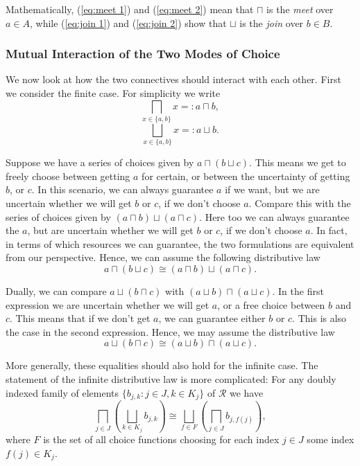 \documentclass[12pt]{article}
\theoremstyle{definition}
\theoremstyle{plain}
\theoremstyle{plain}
\theoremstyle{plain}
\theoremstyle{plain}
\theoremstyle{remark}
\theoremstyle{remark}
\newcommand{\mc}[1]{\mathcal{#1}}
\begin{document}
Mathematically, (\ref{eq:meet 1}) and (\ref{eq:meet 2}) mean that $\sqcap$ is the \emph{meet} over $a \in A$, while (\ref{eq:join 1}) and (\ref{eq:join 2}) show that $\sqcup$ is the \emph{join} over $b \in B$.

\subsubsection{Mutual Interaction of the Two Modes of Choice}\label{sec:intr self}
We now look at how the two connectives should interact with each other. First we consider the finite case. For simplicity we write 
$$\bigsqcap_{x \in \{a,b\}} x =: a  \sqcap b,$$
$$\bigsqcup_{x \in \{a,b\}} x =: a  \sqcup b.$$

Suppose we have a series of choices given by $a \sqcap (b \sqcup c)$. This means we get to freely choose between getting $a$ for certain, or between the uncertainty of getting $b$, or $c$. In this scenario, we can always guarantee $a$ if we want, but we are uncertain whether we will get $b$ or $c$, if we don't choose $a$. Compare this with the series of choices given by $(a \sqcap b) \sqcup (a \sqcap c)$. Here too we can always guarantee the $a$, but are uncertain whether we will get $b$ or $c$, if we don't choose $a$. In fact, in terms of which resources we can guarantee, the two formulations are equivalent from our perspective. Hence, we can assume the following distributive law $$a \sqcap (b \sqcup c) \cong (a \sqcap b) \sqcup (a \sqcap c).$$

Dually, we can compare $a \sqcup (b \sqcap c)$ with $(a \sqcup b) \sqcap (a \sqcup c)$. In the first expression we are uncertain whether we will get $a$, or a free choice between $b$ and $c$. This means that if we don't get $a$, we can guarantee either $b$ or $c$. This is also the case in the second expression. Hence, we may assume the distributive law $$a \sqcup (b \sqcap c) \cong (a \sqcup b) \sqcap (a \sqcup c).$$

More generally, these equalities should also hold for the infinite case. The statement of the infinite distributive law is more complicated: For any doubly indexed family of elements $\{b_{j,k} : j \in J, k \in K_j\}$ of $\mc{R}$ we have
\begin{equation}\label{eq:meet dist}
	\bigsqcap_{j \in J} \left( \bigsqcup_{k \in K_j} b_{j,k} \right) \cong \bigsqcup_{f \in F} \left( \bigsqcap_{j \in J} b_{j,f(j)} \right),
\end{equation}
where $F$ is the set of all choice functions choosing for each index $j \in J$ some index $f(j) \in K_j$.
\end{document}
